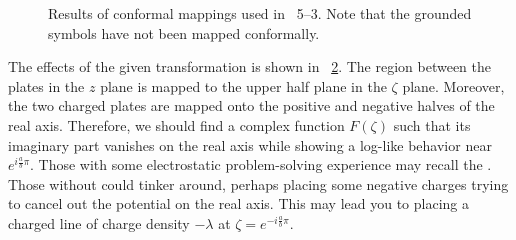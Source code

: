 \begin{figure}[ht]
\begin{subfigure}{0.4\textwidth}
        \caption{}%
        \label{subfig:problem5-3:final}
    \end{subfigure}
    \caption{Results of conformal mappings used in ~5--3.
    Note that the grounded symbols have not been mapped conformally.}%
    \label{fig:problem5-3}
\end{figure}

The effects of the given transformation is shown in ~\ref{fig:problem5-3}.
The region between the plates in the $z$ plane
is mapped to the upper half plane in the $\zeta$ plane.
Moreover, the two charged plates are mapped onto the positive and negative halves of the real axis.
Therefore, we should find a complex function $F(\zeta)$
such that its imaginary part vanishes on the real axis
while showing a log-like behavior near $e^{i\frac{a}{b}\pi}$.
Those with some electrostatic problem-solving experience may recall the
.
Those without could tinker around, perhaps placing some negative charges trying to
cancel out the potential on the real axis.
This may lead you to placing a charged line of charge density $-\lambda$
at $\zeta = e^{-i\frac{a}{b}\pi}$.


